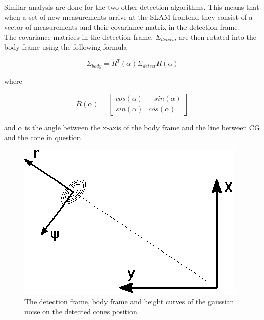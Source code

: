Similar analysis are done for the two other detection algorithms. This means that when a set of new measurements arrive at the SLAM frontend they consist of a vector of measurements and their covariance matrix in the detection frame.  \\

The covariance matrices in the detection frame, $\Sigma_{detect}$, are then rotated into the body frame using the following formula

\begin{equation}
    \Sigma_{body} = R^T(\alpha)\Sigma_{detect}R(\alpha)
    \label{DetectToBodyRot}
\end{equation}

where 

\begin{equation}
    R(\alpha) = \begin{bmatrix} cos(\alpha) & -sin(\alpha) \\ sin(\alpha) & cos(\alpha)
    \end{bmatrix}
\end{equation} 

and $\alpha$ is the angle between the x-axis of the body frame and the line between CG and the cone in question. \\

\begin{figure}
    \centering
    \includegraphics[width=0.5\linewidth]{0_Images/3_Theory/DetectionFrame.eps}
    \caption[The detection frame.]{The detection frame, body frame and height curves of the gaussian noise on the detected cones position.}
    \label{Fig:DetectionFrame}
\end{figure}

